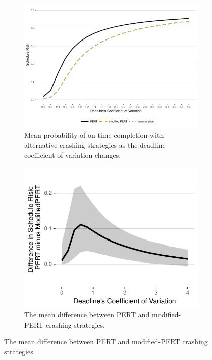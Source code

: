 \documentclass[11pt]{article}
\begin{document}
  
\begin{figure}[H]
\begin{center}
\begin{subfigure}[b]{0.8\linewidth}
\includegraphics[width=\textwidth]{2018-07-25_CoV-vary_mean.pdf}
\caption{Mean probability of on-time completion with alternative crashing strategies as the deadline coefficient of variation changes.}
\label{fig:crash_alternatives}
\end{subfigure}
\begin{subfigure}[t]{0.35\linewidth}
\includegraphics[width=\textwidth]{2018-07-25_critical.pdf}
\caption{The mean difference between PERT and modified-PERT crashing strategies.}
\label{fig:cp_dif}

\end{subfigure}
\end{center}
\end{figure}
\end{document}

